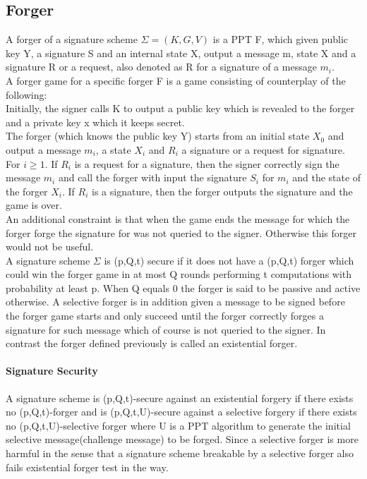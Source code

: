 \documentclass[18]{article}
\begin{document}
\subsection{Forger}
A forger of a signature scheme $\Sigma=(K,G,V)$ is a PPT F, which given public key Y, a signature S and an internal state X, output a message m, state X and a signature R or a request, also denoted as R for a signature of a message $m_i$. \\

A forger game for a specific forger F is a game consisting of counterplay of the following:\\
Initially, the signer calls K to output a public key which is revealed to the forger and a private key x which it keeps secret.\\
The forger (which knows the public key Y) starts from an initial state $X_0$ and output a message $m_i$, a state $X_i$ and $R_i$ a signature or a request for signature.\\
For $i \ge 1$. If $R_i$ is a request for a signature, then the signer correctly sign the message $m_i$ and call the forger with input the signature $S_i$ for $m_i$ and the state of the forger $X_i$. If $R_i$ is a signature, then the forger outputs the signature and the game is over.\\
An additional constraint is that when the game ends the message for which the forger forge the signature for was not queried to the signer. Otherwise this forger would not be useful. \\
A signature scheme $\Sigma$ is (p,Q,t) secure if it does not have a (p,Q,t) forger which could win the forger game in at most Q rounds performing t computations with probability at least p. When Q equals 0 the forger is said to be passive and active otherwise. A selective forger is in addition given a message to be signed before the forger game starts and only succeed until the forger correctly forges a signature for such message which of course is not queried to the signer. In contrast the forger defined previously is called an existential forger.\\
\paragraph{Signature Security} A signature scheme is (p,Q,t)-secure against an existential forgery if there exists no (p,Q,t)-forger and is (p,Q,t,U)-secure against a selective forgery if there exists no (p,Q,t,U)-selective forger where U is a PPT algorithm to generate the initial selective message(challenge message) to be forged. Since a selective forger is more harmful in the sense that a signature scheme breakable by a selective forger also fails existential forger test in the  way.
\end{document}
